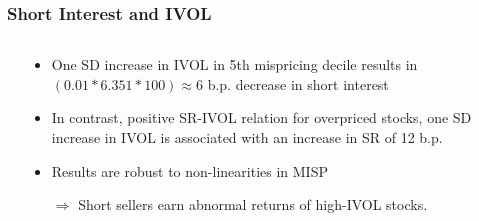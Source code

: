 \documentclass{beamer}
\begin{document}



\begin{frame}[label=ivol_results]
		\frametitle{Short Interest and IVOL}

		\begin{columns}[t]
 \begin{column}{.37\textwidth} 
\vspace*{-0.8cm}
\begin{table}[htbp]
  	\resizebox{\textwidth}{!}{
	 	
	\label{tab:ivola_misp}%
	}
\end{table} 
\end{column}
\begin{column}{.63\textwidth}
\begin{itemize}
\item One SD increase in IVOL in 5th mispricing decile results in $(0.01* 6.351 * 100)\approx 6$ b.p. decrease in short interest  
\item In contrast, positive SR-IVOL relation for overpriced stocks, one SD increase in IVOL is associated with an increase in SR of 12 b.p.
\item Results are robust to non-linearities in MISP
\item[$\Rightarrow$] Short sellers earn abnormal returns of high-IVOL stocks.
\end{itemize}
\hfill \hyperlink{ivol_dynamics}{}
\end{column}
   \end{columns}
\end{frame}

\end{document}
